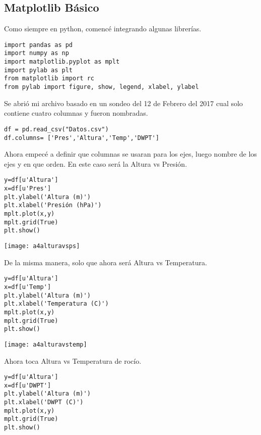 \documentclass[12pt,a4paper]{article}
\begin{document}
\subsection{Matplotlib Básico}

Como siempre en python, comencé integrando algunas librerías.

\begin{verbatim}
import pandas as pd
import numpy as np
import matplotlib.pyplot as mplt
import pylab as plt
from matplotlib import rc
from pylab import figure, show, legend, xlabel, ylabel
\end{verbatim}

Se abrió mi archivo basado en un sondeo del 12 de Febrero del 2017 cual solo contiene cuatro columnas y fueron nombradas.

\begin{verbatim}
df = pd.read_csv("Datos.csv")
df.columns= ['Pres','Altura','Temp','DWPT']
\end{verbatim}

Ahora empecé a definir que columnas se usaran para los ejes, luego nombre de los ejes y en que orden. En este caso será la Altura vs Presión.

\begin{verbatim}
y=df[u'Altura']
x=df[u'Pres']
plt.ylabel('Altura (m)')
plt.xlabel('Presión (hPa)')
mplt.plot(x,y)
mplt.grid(True)
plt.show()
\end{verbatim}

\begin{center}
\texttt{[image: a4alturavsps]}
\end{center}

De la misma manera, solo que ahora será Altura vs Temperatura.

\begin{verbatim}
y=df[u'Altura']
x=df[u'Temp']
plt.ylabel('Altura (m)')
plt.xlabel('Temperatura (C)')
mplt.plot(x,y)
mplt.grid(True)
plt.show()
\end{verbatim}

\begin{center}
\texttt{[image: a4alturavstemp]}
\end{center}

Ahora toca Altura vs Temperatura de rocío.

\begin{verbatim}
y=df[u'Altura']
x=df[u'DWPT']
plt.ylabel('Altura (m)')
plt.xlabel('DWPT (C)')
mplt.plot(x,y)
mplt.grid(True)
plt.show()
\end{verbatim}
\end{document}
